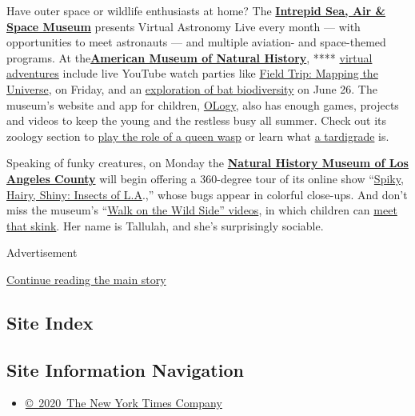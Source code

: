 Have outer space or wildlife enthusiasts at home? The
\textbf{\href{https://www.intrepidmuseum.org/}{Intrepid Sea, Air \&
Space Museum}} presents Virtual Astronomy Live every month --- with
opportunities to meet astronauts --- and multiple aviation- and
space-themed programs. At
the\href{https://www.amnh.org/}{}\textbf{\href{https://www.amnh.org/}{American
Museum of Natural History}}, ****
\href{https://www.amnh.org/explore}{virtual adventures} include live
YouTube watch parties like
\href{https://www.youtube.com/watch?v=lUCC6ae0XZA\&feature=youtu.be}{Field
Trip: Mapping the Universe}, on Friday, and an
\href{https://www.amnh.org/calendar/in-the-field-bats}{exploration of
bat biodiversity} on June 26. The museum's website and app for children,
\href{https://www.amnh.org/explore/ology}{OLogy}, also has enough games,
projects and videos to keep the young and the restless busy all summer.
Check out its zoology section to
\href{https://www.amnh.org/explore/ology/zoology/you-are-the-queen}{play
the role of a queen wasp} or learn what
\href{https://www.amnh.org/explore/ology/zoology/what-s-this-life-at-the-limits}{a
tardigrade} is.

Speaking of funky creatures, on Monday the
\textbf{\href{https://nhm.org/}{Natural History Museum of Los Angeles
County}} will begin offering a 360-degree tour of its online show
``\href{https://nhm.org/spiky-hairy-shiny-insects-la}{Spiky, Hairy,
Shiny: Insects of L.A}.,'' whose bugs appear in colorful close-ups. And
don't miss the museum's ``\href{https://nhmlac.org/connects}{Walk on the
Wild Side'' videos}, in which children can
\href{https://nhmlac.org/stories/chill-out-tallulah-skink}{meet that
skink}. Her name is Tallulah, and she's surprisingly sociable.

Advertisement

\protect\hyperlink{after-bottom}{Continue reading the main story}

\hypertarget{site-index}{%
\subsection{Site Index}\label{site-index}}

\hypertarget{site-information-navigation}{%
\subsection{Site Information
Navigation}\label{site-information-navigation}}

\begin{itemize}
\tightlist
\item
  \href{https://help.nytimes3xbfgragh.onion/hc/en-us/articles/115014792127-Copyright-notice}{©~2020~The
  New York Times Company}
\end{itemize}

